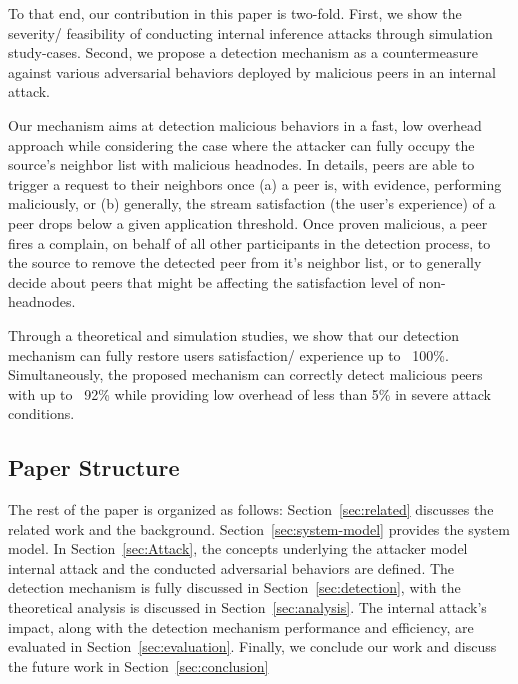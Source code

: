 To that end, our contribution in this paper is two-fold. 
First, we show the severity/ feasibility of conducting internal inference attacks through simulation study-cases.
Second, we propose a detection mechanism as a countermeasure against various adversarial behaviors deployed by malicious peers in an internal attack.

Our mechanism aims at detection malicious behaviors in a fast, low overhead approach while considering the case where the attacker can fully occupy the source's neighbor list with malicious headnodes.
In details, peers are able to trigger a request to their neighbors once (a) a peer is, with evidence, performing maliciously, or (b) generally, the stream satisfaction (the user's experience) of a peer drops below a given application threshold.
Once proven malicious, a peer fires a complain, on behalf of all other participants in the detection process, to the source to remove the detected peer from it's neighbor list,
or to generally decide about peers that might be affecting the satisfaction level of non-headnodes.

Through a theoretical and simulation studies, we show that our detection mechanism can fully restore users satisfaction/ experience up to ~100\%.
Simultaneously, the proposed mechanism can correctly detect malicious peers with up to ~92\% while providing low overhead of less than 5\% in severe attack conditions.

\subsection*{Paper Structure}
The rest of the paper is organized as follows: Section~\ref{sec:related} discusses the related work and the background.
Section~\ref{sec:system-model} provides the system model. In Section~\ref{sec:Attack}, the concepts underlying the attacker model internal attack and the conducted adversarial behaviors are defined.
The detection mechanism is fully discussed in Section~\ref{sec:detection}, with the theoretical analysis is discussed in Section~\ref{sec:analysis}.
The internal attack's impact, along with the detection mechanism performance and efficiency, are evaluated in Section~\ref{sec:evaluation}. Finally, we conclude our work and discuss the future work in Section~\ref{sec:conclusion}

 


